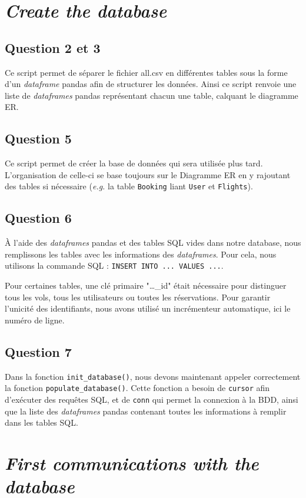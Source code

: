 \documentclass{ceri/sty/rapport}
\begin{document}
\section{\textit{Create the database}}
\subsection{Question 2 et 3}
Ce script permet de séparer le fichier all.csv en différentes tables sous la forme d'un \textit{dataframe} pandas afin de structurer les données.
Ainsi ce script renvoie une liste de \textit{dataframes} pandas représentant chacun une table, calquant le diagramme ER. 

\subsection{Question 5}
Ce script permet de créer la base de données qui sera utilisée plus tard. 
L'organisation de celle-ci se base toujours sur le Diagramme ER en y rajoutant des tables si nécessaire (\textit{e.g.} la table \texttt{Booking} liant \texttt{User} et \texttt{Flights}).

\subsection{Question 6}
À l'aide des \textit{dataframes} pandas et des tables SQL vides dans notre database, nous remplissons les tables avec les informations des \textit{dataframes}.
Pour cela, nous utilisons la commande SQL : \texttt{INSERT INTO ... VALUES ...}.

Pour certaines tables, une clé primaire "…\_id" était nécessaire pour distinguer tous les vols, tous les utilisateurs ou toutes les réservations.
Pour garantir l'unicité des identifiants, nous avons utilisé un incrémenteur automatique, ici le numéro de ligne.

\subsection{Question 7}
Dans la fonction \texttt{init\_database()}, nous devons maintenant appeler correctement la fonction \texttt{populate\_database()}.
Cette fonction a besoin de \texttt{cursor} afin d'exécuter des requêtes SQL, et de \texttt{conn} qui permet la connexion à la BDD, ainsi que la liste des \textit{dataframes} pandas contenant toutes les informations à remplir dans les tables SQL.

\section{\textit{First communications with the database}}
\end{document}
